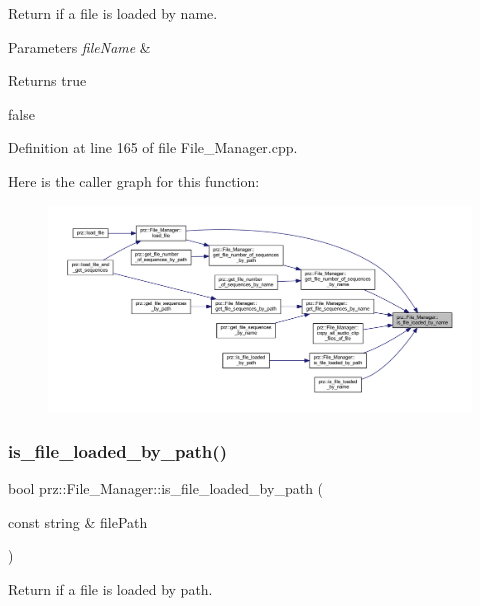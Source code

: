 Return if a file is loaded by name. 


\begin{DoxyParams}{Parameters}
{\em file\+Name} & \\
\hline
\end{DoxyParams}
\begin{DoxyReturn}{Returns}
true 

false 
\end{DoxyReturn}


Definition at line 165 of file File\+\_\+\+Manager.\+cpp.

Here is the caller graph for this function\+:
\nopagebreak
\begin{figure}[H]
\begin{center}
\leavevmode
\includegraphics[width=350pt]{classprz_1_1_file___manager_a57fba84490a328ce3b244198272be7f4_icgraph}
\end{center}
\end{figure}
\mbox{\label{classprz_1_1_file___manager_ab1b6f6447621351af16262236dad73b3}} 
\subsubsection{\texorpdfstring{is\_file\_loaded\_by\_path()}{is\_file\_loaded\_by\_path()}}
{\footnotesize\ttfamily bool prz\+::\+File\+\_\+\+Manager\+::is\+\_\+file\+\_\+loaded\+\_\+by\+\_\+path (\begin{DoxyParamCaption}\item[{const string \&}]{file\+Path }\end{DoxyParamCaption})}



Return if a file is loaded by path. 


